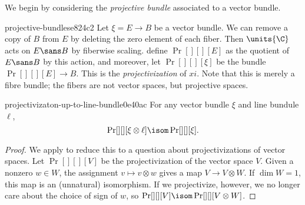 We begin by considering the \emph{projective bundle} associated to a vector bundle.
\begin{defn}{projective-bundles}{e824c2}
  Let $\xi = E \to B$ be a vector bundle. We can remove a copy of $B$ from $E$ by deleting
  the zero element of each fiber. Then $\units{\C}$ acts on $E\sans B$ by fiberwise scaling.
  define $\Pr[][][E]$ as the quotient of $E\sans B$ by this action, and moreover, let
  $\Pr[][][\xi]$ be the bundle $\Pr[][][E] \to B$. This is the \emph{projectivization} of
  $xi$. Note that this is merely a fibre bundle; the fibers are not vector spaces, but
  projective spaces. 
\end{defn}

\begin{prop}{projectivizaton-up-to-line-bundle}{0e40ac}
  For any vector bundle $\xi$ and line bundule $\ell$,
  \[ \Pr[][][\xi \otimes \ell] \isom \Pr[][][\xi]. \]
\end{prop}
\begin{proof}
  We apply  to reduce this to a question about 
  projectivizations of vector spaces.
  Let $\Pr[][][V]$ be the projectivization of the vector space $V$. Given a nonzero $w\in W$,
  the assignment $v\mapsto v\otimes w$ gives a map $V \to V \otimes W$. If $\dim W = 1$,
  this map is an (unnatural) isomorphism. If we projectivize, however, we no longer care
  about the choice of sign of $w$, so $\Pr[][][V] \isom \Pr[][][V \otimes W]$.
\end{proof}


\makeatletter{}\makeatother
